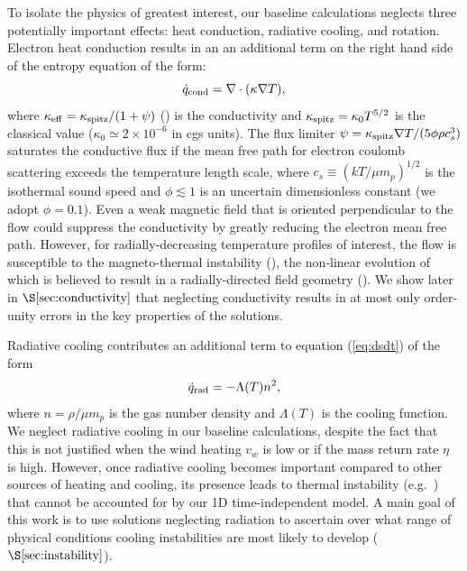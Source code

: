 \documentclass[usenatbib,fleqn]{mn2e}
\newcommand{\vwO}{v_{w}}
\begin{document}
To isolate the physics of greatest interest, our baseline calculations
neglects three potentially important effects: heat conduction,
radiative cooling, and rotation.  Electron heat conduction results in
an an additional term on the right hand side of the entropy equation
of the form:
\begin{equation}
\dot{q}_{\rm cond} = \nabla\cdot(\kappa \nabla T),
\label{eq:qdotcond}
 \end{equation}
 where $\kappa_{\rm eff}=\kappa_{\rm spitz}/(1+\psi)$
 (\citealt{DaltonBalbus:1993a}) is the conductivity and $\kappa_{\rm
   spitz} = \kappa_0 T^{5/2}$ is the classical \citet{Spitzer62} value
 ($\kappa_0\simeq 2\times 10^{-6}$ in cgs units).  The flux limiter
 $\psi = \kappa_{\rm spitz} \nabla T/(5\phi \rho c_s^3)$ saturates the
 conductive flux if the mean free path for electron coulomb scattering
 exceeds the temperature length scale, where $c_s \equiv (kT/\mu
 m_p)^{1/2}$ is the isothermal sound speed and $\phi \lesssim 1$ is an
 uncertain dimensionless constant (we adopt $\phi = 0.1$).  Even a
 weak magnetic field that is oriented perpendicular to the flow could
 suppress the conductivity by greatly reducing the electron mean free
 path.  However, for radially-decreasing temperature profiles of
 interest, the flow is susceptible to the magneto-thermal instability
 (\citealt{Balbus01}), the non-linear evolution of which is believed
 to result in a radially-directed field geometry
 (\citealt{Parrish&Stone07}).  We show later in
 $\S\ref{sec:conductivity}$ that neglecting conductivity results in at
 most only order-unity errors in the key properties of the solutions.

Radiative cooling contributes an additional term to equation (\ref{eq:dsdt}) of the form
\begin{equation}
\dot{q}_{\rm rad} = -\Lambda(T)n^{2},
\label{eq:qdot_rad}
\end{equation}
where $n = \rho/\mu m_p$ is the gas number density and $\Lambda(T)$ is
the cooling function.  We neglect radiative cooling in our baseline
calculations, despite the fact that this is not justified when the
wind heating $\vwO$ is low or if the mass return rate $\eta$ is high.
However, once radiative cooling becomes important compared to other
sources of heating and cooling, its presence leads to thermal
instability (e.g.~\citealt{McCourt+12}) that cannot be accounted for
by our 1D time-independent model.  A main goal of this work is to use
solutions neglecting radiation to ascertain over what range of
physical conditions cooling instabilities are most likely to develop
($\S\ref{sec:instability}$).
\end{document}

